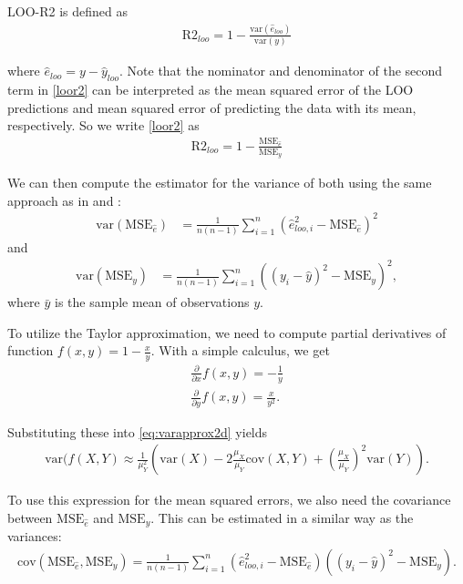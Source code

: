 \documentclass{article}
\begin{document}
LOO-R2 is defined as
\begin{align}
\text{R2}_{loo} = 1 - \frac{\text{var}(\hat{e}_{loo}) }{ \text{var}(y)} \label{loor2}
\end{align}

where $\hat{e}_{loo} = y - \hat{y}_{loo}$. Note that the nominator and denominator of the second term in \eqref{loor2} can be interpreted as the mean squared error of the LOO predictions and mean squared error of predicting the data with its mean, respectively. So we write \eqref{loor2} as 
\begin{align}
    \text{R2}_{loo} = 1 - \frac{\text{MSE}_{\hat{e}} }{ \text{MSE}_y} \label{mser2}
\end{align}

We can then compute the estimator for the variance of both using the same approach as in \cite{sivula_uncertainty_2022} and \cite{vehtari_practical_2016}:
\begin{align}
    \text{var}(\text{MSE}_{\hat{e}}) &= \frac{1}{n (n-1)} \sum_{i = 1}^n \left( \hat{e}_{loo, i}^2 - \text{MSE}_{\hat{e}} \right)^2 \label{vare}
\end{align}
and
\begin{align}
    \text{var}(\text{MSE}_y) &= \frac{1}{n (n-1)} \sum_{i = 1}^n \left( (y_i - \hat{y})^2 -\text{MSE}_y \right)^2 \label{vary},
\end{align}
where $\bar{y}$ is the sample mean of observations $y$. 

To utilize the Taylor approximation, we need to compute partial derivatives of function $f(x,y) = 1 - \frac{x}{y}$. With a simple calculus, we get
\begin{align}
    \frac{\partial}{\partial x}f(x,y) = -\frac{1}{y} \\
    \frac{\partial}{\partial y}f(x,y) = \frac{x}{y^2}.
\end{align}

Substituting these into \eqref{eq:varapprox2d} yields
\begin{align}
    \text{var}(f(X, Y) \approx \frac{1}{\mu_Y^2} \left( \text{var}(X) - 2 \frac{\mu_X}{\mu_Y} \text{cov}(X,Y) + \left( \frac{\mu_X}{\mu_Y} \right)^2 \text{var}(Y) \right) \label{ratiovar}.
\end{align}

 To use this expression for the mean squared errors, we also need the covariance between $\text{MSE}_{\hat{e}}$ and $\text{MSE}_y$. This can be estimated in a similar way as the variances:
 \begin{align}
     \text{cov}(\text{MSE}_{\hat{e}}, \text{MSE}_{y} ) = \frac{1}{n (n -1 )} \sum_{i = 1}^n \left( \hat{e}_{loo, i}^2 - \text{MSE}_{\hat{e}} \right) \left( (y_i - \hat{y})^2 -\text{MSE}_y \right) \label{cov}.
 \end{align}
 
\end{document}
